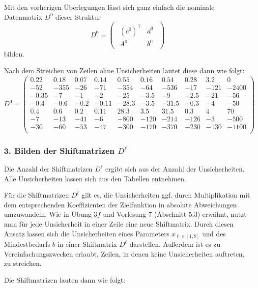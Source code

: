 \documentclass[a4paper,12pt]{article}
\begin{document}
Mit den vorherigen \"Uberlegungen l\"asst sich ganz einfach die nominale Datenmatrix $D^0$ dieser Struktur
\[
D^0 = \begin{pmatrix}\begin{array}{c|c}
(c^0)^\top & d^0 \\ \hline
A^0 & b^0
\end{array}\end{pmatrix}
\]
bilden.

Nach dem Streichen von Zeilen ohne Unsicherheiten lautet diese dann wie folgt:
\[
D^0 = \begin{pmatrix}
0.22 & 0.18 & 0.07 & 0.14 & 0.55 & 0.16 & 0.54 & 0.28 & 3.2 & 0 \\ %
-52 & -355 & -26 & -71 & -354 & -64 & -536 & -17 & -121 & -2400 \\ %
-0.35 & -7 & -1 & -2 & -25 & -3.5 & -9 & -2.5 & -21 & -56 \\ %
-0.4 & -0.6 & -0.2 & -0.11 & -28.3 & -3.5 & -31.5 & -0.3 & -4 & -50 \\ %
0.4 & 0.6 & 0.2 & 0.11 & 28.3 & 3.5 & 31.5 & 0.3 & 4 & 70 \\ %
-7 & -13 & -41 & -6 & -800 & -120 & -214 & -126 & -3 & -500 \\ %
-30 & -60 & -53 & -47 & -300 & -170 & -370 & -230 & -130 & -1100 \\ %
\end{pmatrix}
\]

\subsubsection*{3. Bilden der Shiftmatrizen $D^\ell$}
Die Anzahl der Shiftmatrizen $D^\ell$ ergibt sich aus der Anzahl der Unsicherheiten. Alle Unsicherheiten lassen sich aus den Tabellen entnehmen.

F\"ur die Shiftmatrizen $D^\ell$ gilt es, die Unsicherheiten ggf. durch Multiplikation mit dem entsprechenden Koeffizienten der Zielfunktion in absolute Abweichungen umzuwandeln.
Wie in \"{U}bung $3f$ und Vorlesung $7$ (Abschnitt 5.3) erw\"{a}hnt, nutzt man f\"{u}r jede Unsicherheit in einer Zeile eine neue Shiftmatrix.
Durch diesen Ansatz lassen sich die Unsicherheiten eines Parameters $x_{\ell \in [1,9]}$ und des Mindestbedarfs $b$ in einer Shiftmatrix $D^\ell$ darstellen. Au\ss erdem ist es zu Vereinfachungszwecken erlaubt, Zeilen, in denen keine Unsicherheiten auftreten, zu streichen.

Die Shiftmatrizen lauten dann wie folgt:
\end{document}
